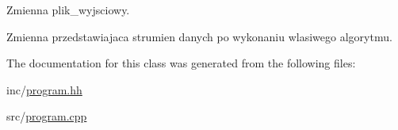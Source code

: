 Zmienna plik\-\_\-wyjsciowy. 

Zmienna przedstawiajaca strumien danych po wykonaniu wlasiwego algorytmu. 

The documentation for this class was generated from the following files\-:\begin{DoxyCompactItemize}
\item 
inc/\hyperlink{program_8hh}{program.\-hh}\item 
src/\hyperlink{program_8cpp}{program.\-cpp}\end{DoxyCompactItemize}
